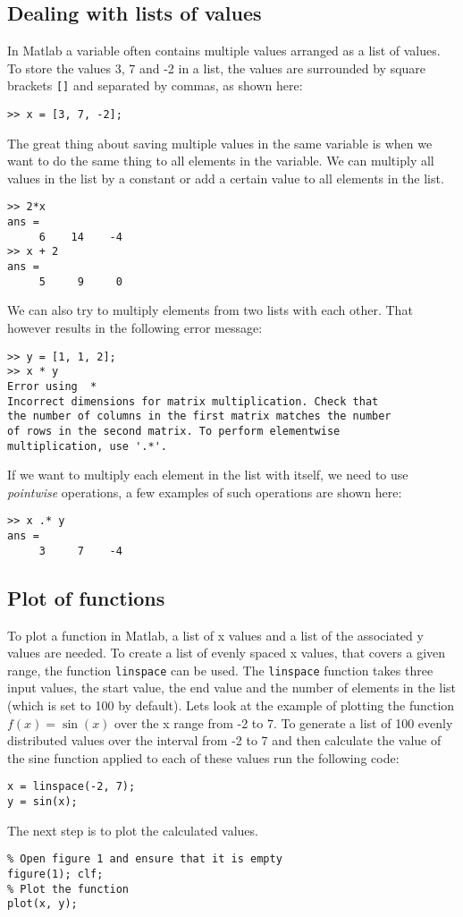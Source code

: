 \subsection{Dealing with lists of values}

In Matlab a variable often contains multiple values arranged as a list of values.
To store the values 3, 7 and  -2 in a list, the values are surrounded by square brackets 
\verb![]! and separated by commas, as shown here:
\begin{lstlisting}
>> x = [3, 7, -2];
\end{lstlisting}
The great thing about saving multiple values in the same variable is when we 
want to do the same thing to all elements in the variable.
We can multiply all values in the list by a constant or add a certain value to all 
elements in the list.
\begin{lstlisting}
>> 2*x
ans = 
     6    14    -4
>> x + 2
ans = 
     5     9     0
\end{lstlisting}

We can also try to multiply elements from two lists with each other.
That however results in the following error message:
\begin{lstlisting}
>> y = [1, 1, 2];
>> x * y
Error using  * 
Incorrect dimensions for matrix multiplication. Check that 
the number of columns in the first matrix matches the number 
of rows in the second matrix. To perform elementwise 
multiplication, use '.*'.
\end{lstlisting}

If we want to multiply each element in the list with itself, we need to use \emph{pointwise} 
operations, a few examples of such operations are shown here:
\begin{lstlisting}
>> x .* y
ans = 
     3     7    -4
\end{lstlisting}




\subsection{Plot of functions}

To plot a function in Matlab, a list of x values and a list of the associated y 
values are needed.
To create a list of evenly spaced x values, that covers a given range, the function
\verb!linspace! can be used.
The \verb!linspace! function takes three input values, the start value, 
the end value and the number of elements in the list (which is set to 100 
by default).
Lets look at the example of plotting the function $f(x) = \sin(x)$ over the x range 
from -2 to 7.
To generate a list of 100 evenly distributed values over the interval from -2 to 7
and then calculate the value of the sine function applied to each of these values
run the following code:
\begin{lstlisting}
x = linspace(-2, 7);
y = sin(x);
\end{lstlisting}
The next step is to plot the calculated values.
\begin{lstlisting}
% Open figure 1 and ensure that it is empty
figure(1); clf;
% Plot the function
plot(x, y);
\end{lstlisting}


